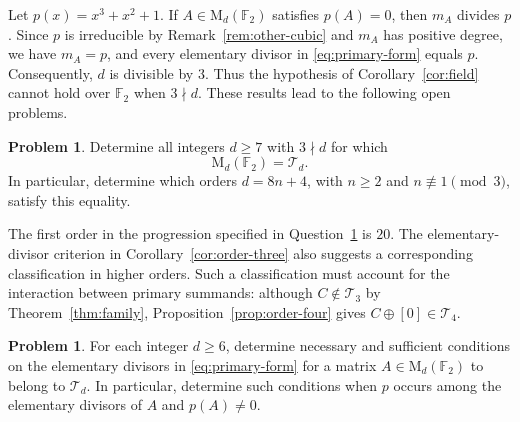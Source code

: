 \documentclass[12pt]{amsart}
\theoremstyle{remark}
\numberwithin{equation}{section}
\theoremstyle{definition}
\newtheorem{question}[theorem]{Problem}
\newcommand{\F}{\mathbb F}
\newcommand{\Mat}{\mathrm M}
\newcommand{\TS}{\mathcal T}
\begin{document}
Let $p(x)=x^3+x^2+1$. If $A\in\Mat_d(\F_2)$ satisfies $p(A)=0$, then $m_A$ divides $p$. Since $p$ is irreducible by Remark~\ref{rem:other-cubic} and $m_A$ has positive degree, we have $m_A=p$, and every elementary divisor in \eqref{eq:primary-form} equals $p$. Consequently, $d$ is divisible by $3$. Thus the hypothesis of Corollary~\ref{cor:field} cannot hold over $\F_2$ when $3\nmid d$. These results lead to the following open problems.

\begin{question}\label{q:orders}
Determine all integers $d\geq7$ with $3\nmid d$ for which
\[
 \Mat_d(\F_2)=\TS_d.
\]
In particular, determine which orders $d=8n+4$, with $n\geq2$ and $n\not\equiv1\pmod3$, satisfy this equality.
\end{question}

The first order in the progression specified in Question~\ref{q:orders} is $20$. The elementary-divisor criterion in Corollary~\ref{cor:order-three} also suggests a corresponding classification in higher orders. Such a classification must account for the interaction between primary summands: although $C\notin\TS_3$ by Theorem~\ref{thm:family}, Proposition~\ref{prop:order-four} gives $C\oplus[0]\in\TS_4$.

\begin{question}\label{q:criterion}
For each integer $d\geq6$, determine necessary and sufficient conditions on the elementary divisors in \eqref{eq:primary-form} for a matrix $A\in\Mat_d(\F_2)$ to belong to $\TS_d$. In particular, determine such conditions when $p$ occurs among the elementary divisors of $A$ and $p(A)\neq0$.
\end{question}
\end{document}
